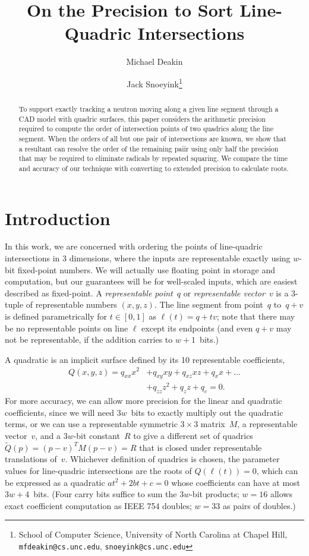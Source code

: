 \documentclass{cccg16}
\title{On the Precision to Sort Line-Quadric Intersections}
\author{Michael Deakin \and Jack Snoeyink\thanks{School of Computer
    Science, University of North Carolina at Chapel Hill, {\tt
      mfdeakin@cs.unc.edu}, {\tt snoeyink@cs.unc.edu}}}
\begin{document}
\thispagestyle{empty}
\maketitle

\begin{abstract}
  To support exactly tracking a neutron moving along a given line
  segment through a CAD model with quadric surfaces, this paper
  considers the arithmetic precision required to compute the order of
  intersection points of two quadrics along the line segment. When the
  orders of all but one pair of intersections are known, we show that a
  resultant can resolve the order of the remaining paiir using only
  half the precision that may be required to eliminate radicals by
  repeated squaring. We compare the time and accuracy of our technique
  with converting to extended precision to calculate roots.
\end{abstract}


\section{Introduction}
In this work, we are concerned with ordering the points of
line-quadric intersections in 3 dimensions, where the inputs are
representable exactly using $w$-bit fixed-point numbers.  We will
actually use floating point in storage and computation, but our
guarantees will be for well-scaled inputs, which are easiest described
as fixed-point.  A {\it representable point}~$q$ or {\it representable
  vector}~$v$ is a $3$-tuple of representable numbers $(x, y, z)$. The
line segment from point~$q$ to~$q+v$ is defined parametrically for
$t\in [0,1]$ as $\ell(t)=q+tv$; note that there may be no
representable points on line $\ell$ except its endpoints (and even
$q+v$ may not be representable, if the addition carries to
$w+1$~bits.)

A quadratic is an implicit surface defined by its 10 representable coefficients,
\begin{align*}Q(x, y, z)=q_{xx} x^2 &+ q_{xy} xy + q_{xz} xz + q_x x + \dots \\
&+ q_{zz} z^2 + q_{z} z + q_c = 0.
\end{align*}
For more accuracy, we can allow more precision for the linear and
quadratic coefficients, since we will need $3w$~bits to exactly
multiply out the quadratic terms, or we can use a representable
symmetric $3\times 3$ matrix~$M$, a representable vector~$v$, and a
$3w$-bit constant~$R$ to give a different set of quadrics $\tilde Q(p)
= (p-v)^TM(p-v) = R$ that is closed under representable translations
of~$v$. Whichever definition of quadrics is chosen, the parameter
values for line-quadric intersections are the roots of $Q(\ell(t))=0$,
which can be expressed as a quadratic $at^2+2bt+c=0$ whose
coefficients can have at most $3w+4$~bits.  (Four carry bits suffice
to sum the $3w$-bit products; $w=16$ allows exact coefficient
computation as IEEE 754 doubles; $w=33$ as pairs of doubles.)
\end{document}
